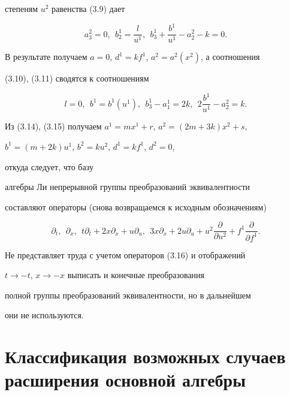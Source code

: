 степеням $u^2$ равенства (3.9) дает 


\begin{equation} 


a^2_3=0,\ \ b^1_2=\frac{l}{u^1},\ \ 


b^1_3+\frac{b^1}{u^1}-a^2_2-k=0. 


\end{equation} 


В результате получаем $a=0$, $d^1=kf^1$, $a^2=a^2(x^2)$, а соотношения 


(3.10), (3.11) сводятся к соотношениям 


\begin{equation} 


l=0,\ \ b^1=b^1(u^1),\ \ b^1_3-a^1_1=2k,\ \ 


2\frac{b^1}{u^1}-a^2_2=k. 


\end{equation} 


Из (3.14), (3.15) получаем $a^1=mx^1+r$, $a^2=(2m+3k)x^2+s$, 


$b^1=(m+2k)u^1$, $b^2=ku^2$, $d^1=kf^1$, $d^2=0$, 


откуда следует, что базу 


алгебры Ли непрерывной группы преобразований эквивалентности 


составляют операторы (снова возвращаемся к исходным обозначениям) 


\begin{equation} 


\partial_t,\ \ \partial_x,\ \ t\partial_t+2x\partial_x+ 


u\partial_u,\ \ 3x\partial_x+2u\partial_u+u^2 


\frac{\partial}{\partial u^2}+f^1 


\frac{\partial}{\partial f^1}. 


\end{equation} 


Не представляет труда с учетом операторов (3.16) и отображений 


$t\to -t$, $x\to -x$ выписать и конечные преобразования 


полной группы преобразований эквивалентности, но в дальнейшем 


они не используются. 


 


\section{Классификация возможных случаев расширения основной алгебры} 


